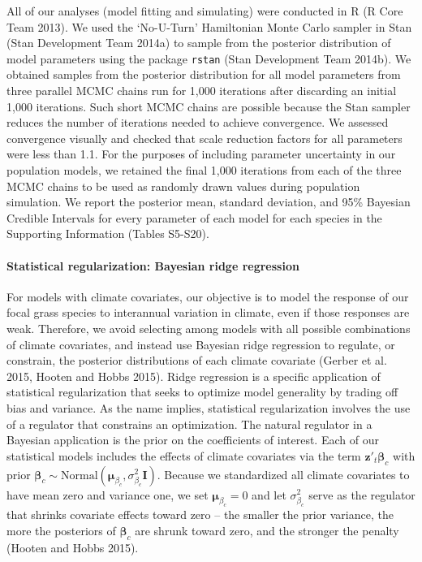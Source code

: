 \documentclass[12pt,]{article}
\begin{document}
All of our analyses (model fitting and simulating) were conducted in R
(R Core Team 2013). We used the `No-U-Turn' Hamiltonian Monte Carlo
sampler in Stan (Stan Development Team 2014a) to sample from the
posterior distribution of model parameters using the package
\texttt{rstan} (Stan Development Team 2014b). We obtained samples from
the posterior distribution for all model parameters from three parallel
MCMC chains run for 1,000 iterations after discarding an initial 1,000
iterations. Such short MCMC chains are possible because the Stan sampler
reduces the number of iterations needed to achieve convergence. We
assessed convergence visually and checked that scale reduction factors
for all parameters were less than 1.1. For the purposes of including
parameter uncertainty in our population models, we retained the final
1,000 iterations from each of the three MCMC chains to be used as
randomly drawn values during population simulation. We report the
posterior mean, standard deviation, and 95\% Bayesian Credible Intervals
for every parameter of each model for each species in the Supporting
Information (Tables S5-S20).

\paragraph{Statistical regularization: Bayesian ridge
regression}\label{statistical-regularization-bayesian-ridge-regression}

For models with climate covariates, our objective is to model the
response of our focal grass species to interannual variation in climate,
even if those responses are weak. Therefore, we avoid selecting among
models with all possible combinations of climate covariates, and instead
use Bayesian ridge regression to regulate, or constrain, the posterior
distributions of each climate covariate (Gerber et al. 2015, Hooten and
Hobbs 2015). Ridge regression is a specific application of statistical
regularization that seeks to optimize model generality by trading off
bias and variance. As the name implies, statistical regularization
involves the use of a regulator that constrains an optimization. The
natural regulator in a Bayesian application is the prior on the
coefficients of interest. Each of our statistical models includes the
effects of climate covariates via the term
\(\textbf{z}'_t \boldsymbol{\beta}_c\) with prior
\(\boldsymbol{\beta}_c \sim \text{Normal}(\boldsymbol{\mu}_{\beta_c}, \sigma_{\beta_c}^2\textbf{I})\).
Because we standardized all climate covariates to have mean zero and
variance one, we set \(\boldsymbol{\mu}_{\beta_c} = 0\) and let
\(\sigma_{\beta_c}^2\) serve as the regulator that shrinks covariate
effects toward zero -- the smaller the prior variance, the more the
posteriors of \(\boldsymbol{\beta}_c\) are shrunk toward zero, and the
stronger the penalty (Hooten and Hobbs 2015).
\end{document}
